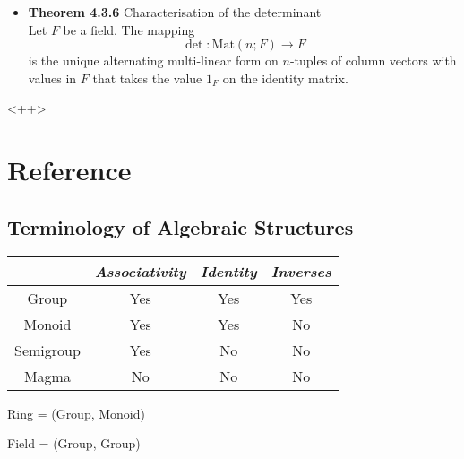 \documentclass[11pt,a4paper]{article}
\begin{document}
\begin{itemize}
    \item \textbf{Theorem 4.3.6} Characterisation of the determinant \\
        Let $F$ be a field.
        The mapping
        \[
            \det : \mathrm{Mat}(n;F) \to F
        \]
        is the unique alternating multi-linear form on $n$-tuples of column vectors
        with values in $F$ that takes the value $1_F$ on the identity matrix.
        
\end{itemize}<++>

\section{Reference}

\subsection{Terminology of Algebraic Structures}

\begin{tabular}{cccc}
    \toprule
              & \emph{Associativity} & \emph{Identity} & \emph{Inverses} \\
    \midrule
    Group     & Yes                  & Yes             & Yes \\
    Monoid    & Yes                  & Yes             & No  \\
    Semigroup & Yes                  & No              & No  \\
    Magma     & No                   & No              & No  \\
    \bottomrule
\end{tabular}

Ring  = (Group, Monoid)

Field = (Group, Group)
\end{document}
